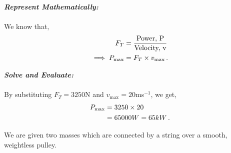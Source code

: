 \begin{subquestions}
\begin{subsubquestions}
\textbf{\textit{Represent Mathematically:}} \\ \\
We know that,
\begin{align}
	F_T & = \frac{\text{Power, P}}{\text{Velocity, v}} \nonumber \\
	\implies P_{\text{max}} & = F_T \times v_{\text{max}} \,.
\end{align}




\textbf{\textit{Solve and Evaluate:}} \\ \\
By substituting $F_T=3250$N and $v_{\text{max}}=20$ms$^{-1}$, we get,
\begin{align}
	P_{\text{max}} & = 3250 \times 20 \nonumber \\
	               & = 65000W = 65kW \,.
\end{align}
	
\end{subsubquestions}	
	
	
\subquestion
We are given two masses which are connected by a string over a smooth, weightless pulley.

\begin{subsubquestions}
	
	\subsubquestion
	

\end{subsubquestions}
\end{subquestions}
